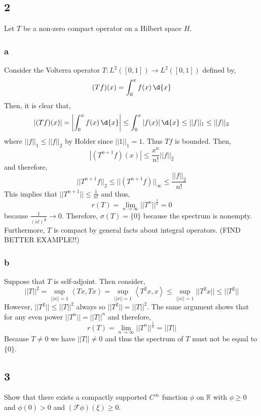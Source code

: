 \documentclass[12pt]{article}
\newcommand{\inner}[2]{\left< #1, #2 \right>}
\newcommand{\R}{\mathbb{R}}
\renewcommand{\F}{\mathcal{F}}
\begin{document}
\subsection{2}

Let $T$ be a non-zero compact operator on a Hilbert space $H$.

\subsubsection{a}

Consider the Volterra operator $T : L^2([0,1]) \to L^2([0,1])$ defined by,
\[ (T f)(x) = \int_0^x f(x) \, \d{x} \]
Then, it is clear that,
\[ | (T f)(x) | = \left| \int_0^x f(x) \, \d{x} \right| \le \int_0^x | f(x) | \, \d{x} \le || f ||_1 \le || f ||_2 \]
where $|| f ||_1 \le || f ||_2$ by Holder since $|| 1 ||_1 = 1$. Thus $T f$ is bounded. Then,
\[ | (T^{n+1} f)(x) | \le \frac{x^n}{n!} || f ||_2 \]
and therefore,
\[ || T^{n+1} f||_2 \le || (T^{n+1} f) ||_{\infty} \le \frac{|| f ||_2}{n!} \]
This implies that $|| T^{n+1} || \le \frac{1}{n!}$ and thus,
\[ r(T) = \lim_{n \to \infty} || T^n ||^{\frac{1}{k}} = 0 \]
because $\frac{1}{(n!)^{\frac{1}{n}}} \to 0$. Therefore, $\sigma(T) = \{ 0 \}$ because the spectrum is nonempty. Furthermore, $T$ is compact by general facts about integral operators. (FIND BETTER EXAMPLE!!)

\subsubsection{b}

Suppose that $T$ is self-adjoint. Then consider,
\[ || T ||^2 = \sup_{|| x || = 1} \inner{T x}{T x} = \sup_{|| x || = 1} \inner{T^2 x}{x} \le \sup_{|| x || = 1} || T^2 x || \le || T^2 || \]
However, $|| T^2 || \le || T ||^2$ always so $|| T^2 || = || T ||^2$. The same argument shows that for any even power $|| T^n || = || T ||^n$ and therefore,
\[ r(T) = \lim_{n \to \infty} || T^n ||^{\frac{1}{n}} = || T || \]
Because $T \neq 0$ we have $|| T || \neq 0$ and thus the spectrum of $T$ must not be equal to $\{ 0 \}$.

\subsection{3}

\begin{exercise}
Show that there exists a compactly supported $C^{\infty}$ function $\phi$ on $\R$ with $\phi \ge 0$ and $\phi(0) > 0$ and $(\F \phi)(\xi) \ge 0$.
\end{exercise}
\end{document}
